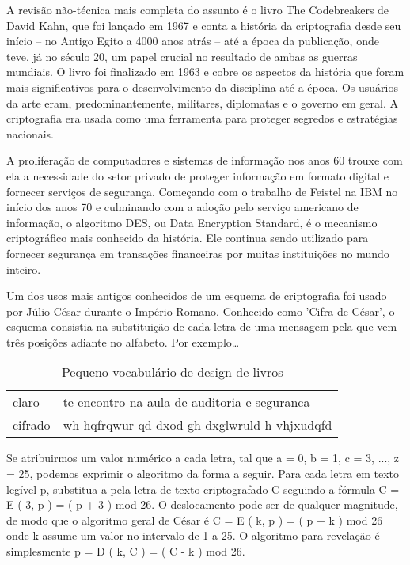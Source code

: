 \documentclass[
	10pt,				%
	openright,			%
	twoside,			%
	a5paper,			%
	english,			%
	french,				%
	spanish,			%
	brazil,				%
	sumario=tradicional
]{abntex2}
\begin{document}
A revisão não-técnica mais completa do assunto é o livro The Codebreakers de David Kahn, que foi lançado em 1967 e conta a história da criptografia desde seu início – no Antigo Egito a 4000 anos atrás – até a época da publicação, onde teve, já no século 20, um papel crucial no resultado de ambas as guerras mundiais. O livro foi finalizado em 1963 e cobre os aspectos da história que foram mais significativos para o desenvolvimento da disciplina até a época. Os usuários da arte eram, predominantemente, militares, diplomatas e o governo em geral. A criptografia era usada como uma ferramenta para proteger segredos e estratégias nacionais.

A proliferação de computadores e sistemas de informação nos anos 60 trouxe com ela a necessidade do setor privado de proteger informação em formato digital e fornecer serviços de segurança. Começando com o trabalho de Feistel na IBM no início dos anos 70 e culminando com a adoção pelo serviço americano de informação, o algoritmo DES, ou Data Encryption Standard, é o mecanismo criptográfico mais conhecido da história. Ele continua sendo utilizado para fornecer segurança em transações financeiras por muitas instituições no mundo inteiro.

Um dos usos mais antigos conhecidos de um esquema de criptografia foi usado por Júlio César durante o Império Romano. Conhecido como 'Cifra de César', o esquema consistia na substituição de cada letra de uma mensagem pela que vem três posições adiante no alfabeto. Por exemplo…

\begin{table}
\caption{Pequeno vocabulário de design de livros\label{vocabulario-texto}}
\ABNTEXfontereduzida
\begin{tabular}{p{1cm}p{6cm}}
claro & te encontro na aula de auditoria e seguranca\\
cifrado & wh hqfrqwur qd dxod gh dxglwruld h vhjxudqfd\\
\bottomrule
\end{tabular}
\end{table}

Se atribuirmos um valor numérico a cada letra, tal que a = 0, b = 1, c = 3, ..., z = 25, podemos exprimir o algoritmo da forma a seguir. Para cada letra em texto legível p, substitua-a pela letra de texto criptografado C seguindo a fórmula C = E ( 3, p ) = ( p + 3 ) mod 26. O deslocamento pode ser de qualquer magnitude, de modo que o algoritmo geral de César é C = E ( k, p ) = ( p + k ) mod 26 onde k assume um valor no intervalo de 1 a 25. O algoritmo para revelação é simplesmente p = D ( k, C ) = ( C - k ) mod 26.
\end{document}
